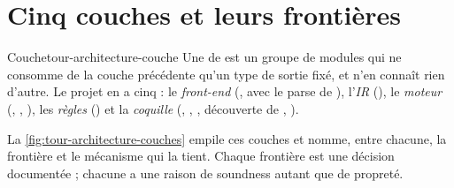 \section{Cinq couches et leurs frontières}
\label{sec:tour-architecture-couches}

\begin{definition}{Couche}{tour-architecture-couche}
Une  de \reactant{} est un groupe de modules qui ne consomme de la couche précédente qu'un type de sortie fixé, et n'en connaît rien d'autre. Le projet en a cinq : le \emph{front-end} (, avec le parse de ), l'\emph{IR} (), le \emph{moteur} (, , ), les \emph{règles} () et la \emph{coquille} (, , , découverte de , ).
\end{definition}

La \cref{fig:tour-architecture-couches} empile ces couches et nomme, entre chacune, la frontière et le mécanisme qui la tient. Chaque frontière est une décision documentée ; chacune a une raison de soundness autant que de propreté.

